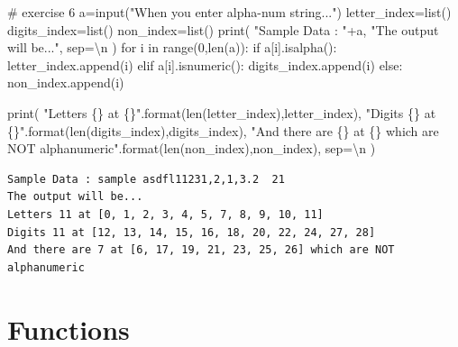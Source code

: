 \documentclass[
  a4paper,
  DIV=11,
  numbers=noendperiod]{scrreprt}
\newenvironment{Shaded}{\begin{snugshade}}{\end{snugshade}}
\newcommand{\BuiltInTok}[1]{\textcolor[rgb]{0.00,0.23,0.31}{#1}}
\newcommand{\CharTok}[1]{\textcolor[rgb]{0.13,0.47,0.30}{#1}}
\newcommand{\CommentTok}[1]{\textcolor[rgb]{0.37,0.37,0.37}{#1}}
\newcommand{\ControlFlowTok}[1]{\textcolor[rgb]{0.00,0.23,0.31}{#1}}
\newcommand{\DecValTok}[1]{\textcolor[rgb]{0.68,0.00,0.00}{#1}}
\newcommand{\KeywordTok}[1]{\textcolor[rgb]{0.00,0.23,0.31}{#1}}
\newcommand{\NormalTok}[1]{\textcolor[rgb]{0.00,0.23,0.31}{#1}}
\newcommand{\OperatorTok}[1]{\textcolor[rgb]{0.37,0.37,0.37}{#1}}
\newcommand{\SpecialCharTok}[1]{\textcolor[rgb]{0.37,0.37,0.37}{#1}}
\newcommand{\StringTok}[1]{\textcolor[rgb]{0.13,0.47,0.30}{#1}}
\begin{document}
\begin{Shaded}
\begin{Highlighting}[]
\CommentTok{\# exercise 6}
\NormalTok{a}\OperatorTok{=}\BuiltInTok{input}\NormalTok{(}\StringTok{"When you enter alpha{-}num string..."}\NormalTok{)}
\NormalTok{letter\_index}\OperatorTok{=}\BuiltInTok{list}\NormalTok{()}
\NormalTok{digits\_index}\OperatorTok{=}\BuiltInTok{list}\NormalTok{()}
\NormalTok{non\_index}\OperatorTok{=}\BuiltInTok{list}\NormalTok{()}
\BuiltInTok{print}\NormalTok{(}
    \StringTok{"Sample Data : "}\OperatorTok{+}\NormalTok{a,}
    \StringTok{"The output will be..."}\NormalTok{,}
\NormalTok{    sep}\OperatorTok{=}\StringTok{\textquotesingle{}}\CharTok{\textbackslash{}n}\StringTok{\textquotesingle{}}
\NormalTok{)}
\ControlFlowTok{for}\NormalTok{ i }\KeywordTok{in} \BuiltInTok{range}\NormalTok{(}\DecValTok{0}\NormalTok{,}\BuiltInTok{len}\NormalTok{(a)):}
    \ControlFlowTok{if}\NormalTok{ a[i].isalpha():}
\NormalTok{        letter\_index.append(i)}
    \ControlFlowTok{elif}\NormalTok{ a[i].isnumeric():}
\NormalTok{        digits\_index.append(i)}
    \ControlFlowTok{else}\NormalTok{: non\_index.append(i)}

\BuiltInTok{print}\NormalTok{(}
    \StringTok{"Letters }\SpecialCharTok{\{\}}\StringTok{ at }\SpecialCharTok{\{\}}\StringTok{"}\NormalTok{.}\BuiltInTok{format}\NormalTok{(}\BuiltInTok{len}\NormalTok{(letter\_index),letter\_index),}
    \StringTok{"Digits }\SpecialCharTok{\{\}}\StringTok{ at }\SpecialCharTok{\{\}}\StringTok{"}\NormalTok{.}\BuiltInTok{format}\NormalTok{(}\BuiltInTok{len}\NormalTok{(digits\_index),digits\_index),}
    \StringTok{"And there are }\SpecialCharTok{\{\}}\StringTok{ at }\SpecialCharTok{\{\}}\StringTok{ which are NOT alphanumeric"}\NormalTok{.}\BuiltInTok{format}\NormalTok{(}\BuiltInTok{len}\NormalTok{(non\_index),non\_index),}
\NormalTok{    sep}\OperatorTok{=}\StringTok{\textquotesingle{}}\CharTok{\textbackslash{}n}\StringTok{\textquotesingle{}}
\NormalTok{)}
\end{Highlighting}
\end{Shaded}

\begin{verbatim}
Sample Data : sample asdfl11231,2,1,3.2  21
The output will be...
Letters 11 at [0, 1, 2, 3, 4, 5, 7, 8, 9, 10, 11]
Digits 11 at [12, 13, 14, 15, 16, 18, 20, 22, 24, 27, 28]
And there are 7 at [6, 17, 19, 21, 23, 25, 26] which are NOT alphanumeric
\end{verbatim}

\chapter{Functions}\label{functions}
\end{document}
